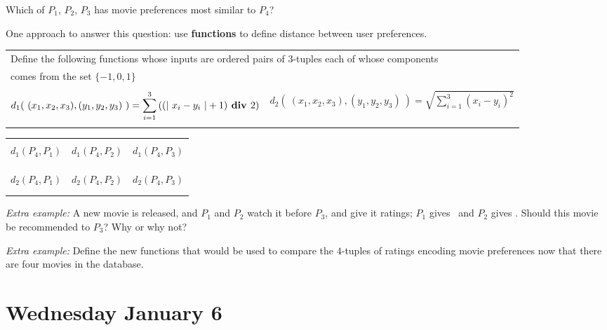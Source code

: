 \documentclass[12pt, oneside]{article}
\begin{document}
Which of $P_1$, $P_2$, $P_3$ has movie preferences most similar to $P_4$?

One approach to answer this question: use {\bf functions} to define distance between user preferences.

\begin{center}
\begin{tabular}{|c|c|}
\hline
\multicolumn{2}{|l|}{
Define the following functions whose inputs are ordered pairs of $3$-tuples each of whose components}\\
\multicolumn{2}{|l|}{
 comes from the set $\{-1,0,1\}$
}
\\
\hline
&\\
$\displaystyle d_{1}(~ (x_1, x_2, x_3) , (y_1, y_2, y_3) ~) =  \sum_{i=1}^3\left( (\lvert~x_i-y_i~\rvert + 1) \textbf{ div } 2 \right)$
&
$\displaystyle d_{2}(~ (x_1, x_2, x_3) , (y_1, y_2, y_3) ~) =  \sqrt{ \sum_{i=1}^3 (x_i - y_i)^2}$ \\
&\\
\hline
\end{tabular}
\end{center}

\begin{tabularx}{\textwidth}{|X|X|X|}
\hline &&\\
$d_1(P_4, P_1)$ & $d_1(P_4, P_2)$ & $d_1(P_4, P_3)$ \\
&&\\
&&\\
\hline&&\\
$d_2(P_4, P_1)$ & $d_2(P_4, P_2)$ & $d_2(P_4, P_3)$ \\
&&\\
&&\\
\hline
\end{tabularx}

\vfill


{\it Extra example:} A new movie is released, and $P_1$ and $P_2$ watch it before $P_3$, and give it
ratings; $P_1$ gives \cmark~and $P_2$ gives \xmark.
Should this movie be recommended to $P_3$? Why or why not?

{\it Extra example:} Define the new functions that would be used to compare the $4$-tuples of ratings encoding
movie preferences now that there are four movies in the database.


\section*{Wednesday January 6}
\end{document}
